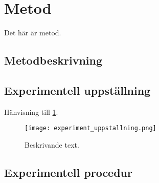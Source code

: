\section{Metod} \label{s:metod}
%
Det här är metod.
\subsection{Metodbeskrivning}
\subsection{Experimentell uppställning}
Hänvisning till \cref{fig:namn}.
%
\begin{figure} [H]
    \centering 
    \texttt{[image: experiment\_uppstallning.png]}
    \caption{Beskrivande text.}
    \label{fig:namn}
\end{figure}
%
\subsection{Experimentell procedur}